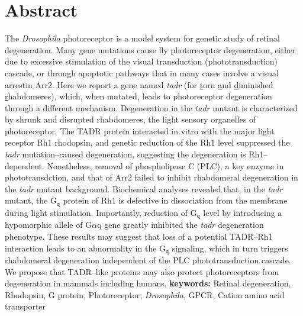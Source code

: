 \section{Abstract}
The \textit{Drosophila} photoreceptor is a model system for genetic study of retinal degeneration.  Many gene mutations cause fly photoreceptor degeneration, either due to excessive stimulation of the visual transduction (phototransduction) cascade, or through apoptotic pathways that in many cases involve a visual arrestin Arr2.  Here we report a gene named \textit{tadr} (for \underline{t}orn \underline{a}nd \underline{d}iminished \underline{r}habdomeres), which, when mutated, leads to photoreceptor degeneration through a different mechanism. Degeneration in the \textit{tadr} mutant is characterized by shrunk and disrupted rhabdomeres, the light sensory organelles of photoreceptor. The TADR protein interacted in vitro with the major light receptor Rh1 rhodopsin, and genetic reduction of the Rh1 level suppressed the \textit{tadr} mutation--caused degeneration, suggesting the degeneration is Rh1--dependent.  Nonetheless, removal of phospholipase C (PLC), a key enzyme in phototransdction, and that of Arr2 failed to inhibit rhabdomeral degeneration in the \textit{tadr} mutant background.  Biochemical analyses revealed that, in the \textit{tadr} mutant, the G$_{\texttt{q}}$ protein of Rh1 is defective in dissociation from the membrane during light stimulation.  Importantly, reduction of G$_{\texttt{q}}$ level by introducing a hypomorphic allele of G$\alpha$q gene greatly inhibited the \textit{tadr} degeneration phenotype.  These results may suggest that loss of a potential TADR--Rh1 interaction leads to an abnormality in the G$_{\texttt{q}}$ signaling, which in turn triggers rhabdomeral degeneration independent of the PLC phototransduction cascade.  We propose that TADR--like proteins may also protect photoreceptors from degeneration in mammals including humans.
\textbf{keywords:} Retinal degeneration, Rhodopsin, G protein, Photoreceptor, \textit{Drosophila}, GPCR, Cation amino acid transporter

